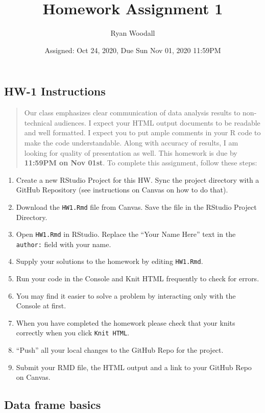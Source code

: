 \documentclass[
]{article}
\title{Homework Assignment 1}
\author{Ryan Woodall}
\date{Assigned: Oct 24, 2020, Due Sun Nov 01, 2020 11:59PM}
\begin{document}
\maketitle

\hypertarget{hw-1-instructions}{%
\subsection{HW-1 Instructions}\label{hw-1-instructions}}

\begin{quote}
Our class emphasizes clear communication of data analysis results to
non-technical audiences. I expect your HTML output documents to be
readable and well formatted. I expect you to put ample comments in your
R code to make the code understandable. Along with accuracy of results,
I am looking for quality of presentation as well. This homework is due
by \textbf{11:59PM on Nov 01st}. To complete this assignment, follow
these steps:
\end{quote}

\begin{enumerate}
\def\labelenumi{\arabic{enumi}.}
\item
  Create a new RStudio Project for this HW. Sync the project directory
  with a GitHub Repository (see instructions on Canvas on how to do
  that).
\item
  Download the \texttt{HW1.Rmd} file from Canvas. Save the file in the
  RStudio Project Directory.
\item
  Open \texttt{HW1.Rmd} in RStudio. Replace the ``Your Name Here'' text
  in the \texttt{author:} field with your name.
\item
  Supply your solutions to the homework by editing \texttt{HW1.Rmd}.
\item
  Run your code in the Console and Knit HTML frequently to check for
  errors.
\item
  You may find it easier to solve a problem by interacting only with the
  Console at first.
\item
  When you have completed the homework please check that your knits
  correctly when you click \texttt{Knit\ HTML}.
\item
  ``Push'' all your local changes to the GitHub Repo for the project.
\item
  Submit your RMD file, the HTML output and a link to your GitHub Repo
  on Canvas.
\end{enumerate}

\hypertarget{data-frame-basics}{%
\subsection{Data frame basics}\label{data-frame-basics}}
\end{document}

